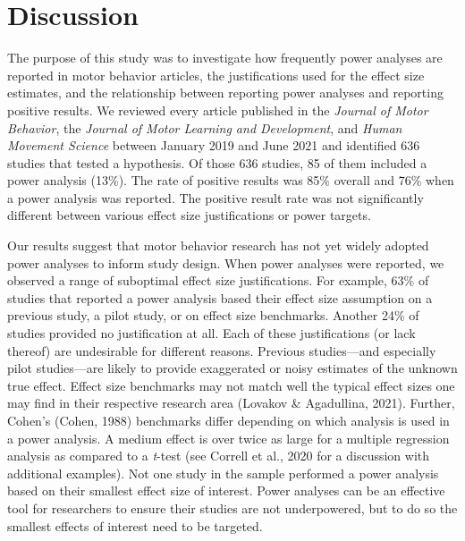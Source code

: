 \documentclass[
  doc, donotrepeattitle,floatsintext]{apa7}
\begin{document}
\pagebreak

\hypertarget{discussion}{%
\section{Discussion}\label{discussion}}

The purpose of this study was to investigate how frequently power analyses are reported in motor behavior articles, the justifications used for the effect size estimates, and the relationship between reporting power analyses and reporting positive results. We reviewed every article published in the \emph{Journal of Motor Behavior}, the \emph{Journal of Motor Learning and Development}, and \emph{Human Movement Science} between January 2019 and June 2021 and identified 636 studies that tested a hypothesis. Of those 636 studies, 85 of them included a power analysis (13\%). The rate of positive results was 85\% overall and 76\% when a power analysis was reported. The positive result rate was not significantly different between various effect size justifications or power targets.

Our results suggest that motor behavior research has not yet widely adopted power analyses to inform study design. When power analyses were reported, we observed a range of suboptimal effect size justifications. For example, 63\% of studies that reported a power analysis based their effect size assumption on a previous study, a pilot study, or on effect size benchmarks. Another 24\% of studies provided no justification at all. Each of these justifications (or lack thereof) are undesirable for different reasons. Previous studies---and especially pilot studies---are likely to provide exaggerated or noisy estimates of the unknown true effect. Effect size benchmarks may not match well the typical effect sizes one may find in their respective research area (Lovakov \& Agadullina, 2021). Further, Cohen's (Cohen, 1988) benchmarks differ depending on which analysis is used in a power analysis. A medium effect is over twice as large for a multiple regression analysis as compared to a \emph{t}-test (see Correll et al., 2020 for a discussion with additional examples). Not one study in the sample performed a power analysis based on their smallest effect size of interest. Power analyses can be an effective tool for researchers to ensure their studies are not underpowered, but to do so the smallest effects of interest need to be targeted.
\end{document}
